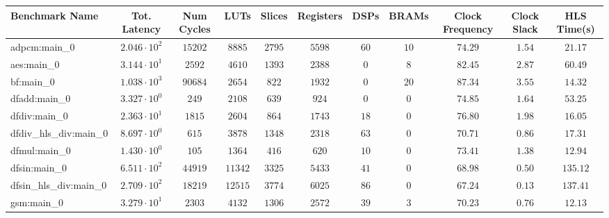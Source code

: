 \begin{tabular}{|l|c|c|c|c|c|c|c|c|c|c|}
\hline
Benchmark Name          & Tot. Latency           & Num Cycles & LUTs      & Slices    & Registers & DSPs    & BRAMs   & Clock Frequency & Clock Slack & HLS Time(s) \\
\hline
adpcm:main\_0           & $ 2.046 \cdot 10^{2} $ & $ 15202  $ & $ 8885  $ & $ 2795  $ & $ 5598  $ & $ 60  $ & $ 10  $ & $ 74.29       $ & $ 1.54    $ & $ 21.17   $ \\
aes:main\_0             & $ 3.144 \cdot 10^{1} $ & $ 2592   $ & $ 4610  $ & $ 1393  $ & $ 2388  $ & $ 0   $ & $ 8   $ & $ 82.45       $ & $ 2.87    $ & $ 60.49   $ \\
bf:main\_0              & $ 1.038 \cdot 10^{3} $ & $ 90684  $ & $ 2654  $ & $ 822   $ & $ 1932  $ & $ 0   $ & $ 20  $ & $ 87.34       $ & $ 3.55    $ & $ 14.32   $ \\
dfadd:main\_0           & $ 3.327 \cdot 10^{0} $ & $ 249    $ & $ 2108  $ & $ 639   $ & $ 924   $ & $ 0   $ & $ 0   $ & $ 74.85       $ & $ 1.64    $ & $ 53.25   $ \\
dfdiv:main\_0           & $ 2.363 \cdot 10^{1} $ & $ 1815   $ & $ 2604  $ & $ 864   $ & $ 1743  $ & $ 18  $ & $ 0   $ & $ 76.80       $ & $ 1.98    $ & $ 16.05   $ \\
dfdiv\_hls\_div:main\_0 & $ 8.697 \cdot 10^{0} $ & $ 615    $ & $ 3878  $ & $ 1348  $ & $ 2318  $ & $ 63  $ & $ 0   $ & $ 70.71       $ & $ 0.86    $ & $ 17.31   $ \\
dfmul:main\_0           & $ 1.430 \cdot 10^{0} $ & $ 105    $ & $ 1364  $ & $ 416   $ & $ 620   $ & $ 10  $ & $ 0   $ & $ 73.41       $ & $ 1.38    $ & $ 12.94   $ \\
dfsin:main\_0           & $ 6.511 \cdot 10^{2} $ & $ 44919  $ & $ 11342 $ & $ 3325  $ & $ 5433  $ & $ 41  $ & $ 0   $ & $ 68.98       $ & $ 0.50    $ & $ 135.12  $ \\
dfsin\_hls\_div:main\_0 & $ 2.709 \cdot 10^{2} $ & $ 18219  $ & $ 12515 $ & $ 3774  $ & $ 6025  $ & $ 86  $ & $ 0   $ & $ 67.24       $ & $ 0.13    $ & $ 137.41  $ \\
gsm:main\_0             & $ 3.279 \cdot 10^{1} $ & $ 2303   $ & $ 4132  $ & $ 1306  $ & $ 2572  $ & $ 39  $ & $ 3   $ & $ 70.23       $ & $ 0.76    $ & $ 12.13   $ \\

\end{tabular}
